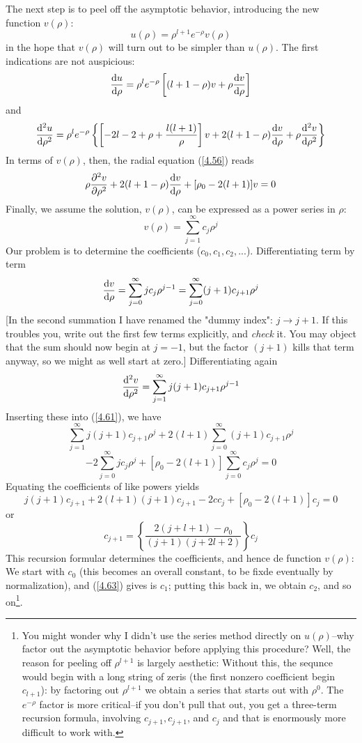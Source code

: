 The next step is to peel off the asymptotic behavior, introducing the new function $v(\rho)$:
\begin{equation}\label{4.60}
	u(\rho)=\rho^{l+1}e^{-\rho}v(\rho)
\end{equation}
in the hope that $v(\rho)$ will turn out to be simpler than $u(\rho)$. The first indications are not auspicious: $$\dv{u}{\rho}=\rho^le^{-\rho}\left[(l+1-\rho)v+\rho\dv{v}{\rho}\right]$$ and $$\dv[2]{u}{\rho}=\rho^le^{-\rho}\left\{\left[-2l-2+\rho+\frac{l(l+1)}{\rho}\right]v+2(l+1-\rho)\dv{v}{\rho}+\rho\dv[2]{v}{\rho}\right\}$$ In terms of $v(\rho)$, then, the radial equation (\ref{4.56}) reads
\begin{equation}\label{4.61}
	\rho\pdv[2]{v}{\rho}+2(l+1-\rho)\dv{v}{\rho}+[\rho_0-2(l+1)]v=0
\end{equation}
Finally, we assume the solution, $v(\rho)$, can be expressed as a power series in $\rho$:
\begin{equation}\label{4.62}
	v(\rho)=\sum_{j=1}^\infty c_j\rho^j
\end{equation}
Our problem is to determine the coefficients ($c_0, c_1, c_2,...$). Differentiating term by term $$\dv{v}{\rho}=\sum_{j=0}^\infty jc_j\rho^{j-1}=\sum_{j=0}^\infty(j+1)c_{j+1}\rho^j$$
[In the second summation I have renamed the "dummy index": $j\to j+1$. If this troubles you, write out the first few terms explicitly, and \textit{check} it. You may object that the sum should now begin at $j=-1$, but the factor $(j+1)$ kills that term anyway, so we might as well start at zero.] Differentiating again $$\dv[2]{v}{\rho}=\sum_{j=1}^\infty j(j+1)c_{j+1}\rho^{j-1}$$ Inserting these into (\ref{4.61}), we have $$\sum_{j=1}^\infty j(j+1)c_{j+1}\rho^j+2(l+1)\sum_{j=0}^\infty (j+1)c_{j+1}\rho^j$$ $$-2\sum_{j=0}^\infty jc_j\rho^j+[\rho_0-2(l+1)]\sum_{j=0}^\infty c_j\rho^j=0$$ Equating the coefficients of like powers yields $$j(j+1)c_{j+1}+2(l+1)(j+1)c_{j+1}-2cc_j+[\rho_0-2(l+1)]c_j=0$$ or 
\begin{equation}\label{4.63}
	c_{j+1}=\left\{\frac{2(j+l+1)-\rho_0}{(j+1)(j+2l+2)}\right\}c_j
\end{equation}
This recursion formular determines the coefficients, and hence de function $v(\rho)$: We start with $c_0$ (this becomes an overall constant, to be fixde eventually by normalization), and (\ref{4.63}) gives is $c_1$; putting this back in, we obtain $c_2$, and so on\footnote{You might wonder why I didn't use the series method directly on $u(\rho)$--why factor out the asymptotic behavior before applying this procedure? Well, the reason for peeling off $\rho^{l+1}$ is largely aesthetic: Without this, the sequnce would begin with a long string of zeris (the first nonzero coefficient begin $c_{l+1}$): by factoring out $\rho^{l+1}$ we obtain a series that starts out with $\rho^0$. The $e^{-\rho}$ factor is more critical--if you don't pull that out, you get a three-term recursion formula, involving $c_{j+1}, c_{j+1}$, and $c_j$  and that is enormously more difficult to work with.}.

